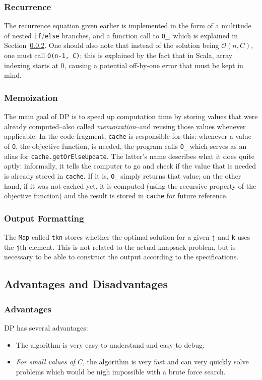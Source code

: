 \documentclass[journal]{IEEEtran}
\newcommand{\scala}[1]{\texttt{#1}}
\begin{document}
\subsubsection{Recurrence}
The recurrence equation given earlier is implemented in the form of a multitude of nested \scala{if}/\scala{else} branches, and a function call to \scala{O_}, which is explained in Section~\ref{sec:dpmemo}.
One should also note that instead of the solution being \(\mathscr{O}(n, C)\), one must call \scala{O(n-1, C)}; this is explained by the fact that in Scala, array indexing starts at 0, causing a potential off-by-one error that must be kept in mind.
\subsubsection{Memoization}
\label{sec:dpmemo}
The main goal of DP is to speed up computation time by storing values that were already computed--also called \emph{memoization}--and reusing those values whenever applicable.
In the code fragment, \scala{cache} is responsible for this: whenever a value of \scala{O}, the objective function, is needed, the program calls \scala{O_} which serves as an alias for \scala{cache.getOrElseUpdate}.
The latter's name describes what it does quite aptly: informally, it tells the computer to go and check if the value that is needed is already stored in \scala{cache}.
If it is, \scala{O_} simply returns that value; on the other hand, if it was not cached yet, it is computed (using the recursive property of the objective function) and the result is stored in \scala{cache} for future reference.
\subsubsection{Output Formatting}
\label{sec:dpoutput}
The \scala{Map} called \scala{tkn} stores whether the optimal solution for a given \scala{j} and \scala{k} uses the \scala{j}th element.
This is not related to the actual knapsack problem, but is necessary to be able to construct the output according to the specifications.

\subsection{Advantages and Disadvantages}
\subsubsection{Advantages}
DP has several advantages:
\begin{itemize}
	\item The algorithm is very easy to understand and easy to debug.
	\item \emph{For small values of \(C\)}, the algorithm is very fast and can very quickly solve problems which would be nigh impossible with a brute force search.
\end{itemize}
\end{document}
